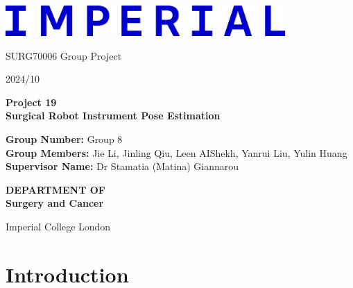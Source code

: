 \documentclass[12pt]{article}
\begin{document}
\begin{titlepage}
      \centering

      \includegraphics[width=0.8\textwidth]{Imperial_College_London_new_logo.png} %
      \vspace*{1cm}

      \Large
      SURG70006 Group Project

      \large
      2024/10

      \vspace{0.5cm}
      \Huge
      \textbf{Project 19 \\ Surgical Robot Instrument Pose Estimation }

      \vspace{1.3cm}


      \begin{mdframed}
            \normalsize %
            \textbf{Group Number:} Group 8\\[20pt] %
            \textbf{Group Members:} Jie Li, Jinling Qiu, Leen AIShekh, Yanrui Liu, Yulin Huang\\[20pt] %
            \textbf{Supervisor Name:} Dr Stamatia (Matina) Giannarou %
      \end{mdframed}

      \vspace{2cm} %
      \Large
      \textbf{DEPARTMENT OF}\\
      \vspace{0.1cm} %
      \textbf{Surgery and Cancer}

      \vspace{4cm} %
      \large
      Imperial College London\\
      


\end{titlepage}

\newpage
\tableofcontents

\newpage

\section{Introduction}
\end{document}
